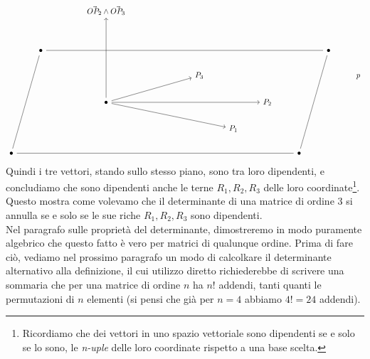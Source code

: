 \[\begin{tikzcd}
	&&& {\vec{OP_2}\wedge\vec{OP_3}} \\
	\\
	& \bullet &&&&&&&&& \bullet \\
	&&&&&& {P_3} &&&&& {\textit{p}} \\
	&&& \bullet && {} &&& {P_2} \\
	&&&&&&& {P_1} \\
	\bullet &&&&&&&&& \bullet
	\arrow[no head, from=7-1, to=3-2]
	\arrow[no head, from=7-1, to=7-10]
	\arrow[no head, from=7-10, to=3-11]
	\arrow[from=5-4, to=1-4]
	\arrow[from=5-4, to=6-8]
	\arrow[from=5-4, to=5-9]
	\arrow[from=5-4, to=4-7]
	\arrow[no head, from=3-2, to=3-11]
\end{tikzcd}\]
Quindi i tre vettori, stando sullo stesso piano, sono tra loro dipendenti, e
concludiamo che sono dipendenti anche le terne $R_1, R_2, R_3$ delle loro coordinate\footnote{Ricordiamo che dei vettori in uno spazio vettoriale sono dipendenti se e solo se lo sono, le \textit{n-uple} delle loro coordinate rispetto a una base scelta.}. Questo mostra come volevamo che il determinante di una matrice di ordine 3 si annulla se e solo se le sue riche $R_1, R_2,R_3$ sono dipendenti.\\
Nel paragrafo sulle proprietà del determinante, dimostreremo in modo puramente algebrico che questo fatto è vero per matrici di qualunque ordine. Prima di fare ciò, vediamo nel prossimo paragrafo un modo di calcolkare il determinante alternativo alla definizione, il cui utilizzo diretto richiederebbe di scrivere una sommaria che per una matrice di ordine $n$ ha $n!$ addendi, tanti quanti le permutazioni di $n$ elementi (si pensi che già per $n=4$ abbiamo $4!=24$ addendi).
